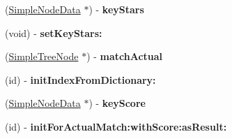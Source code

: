 \begin{DoxyCompactItemize}
\item 
\hypertarget{class_simple_tree_node_aee7720229f05856ff31e09b81da7178c}{
(\hyperlink{interface_simple_node_data}{SimpleNodeData} $\ast$) -\/ {\bfseries keyStars}}
\label{class_simple_tree_node_aee7720229f05856ff31e09b81da7178c}

\item 
\hypertarget{class_simple_tree_node_a2d561f91aee8a54c6367390720a39137}{
(void) -\/ {\bfseries setKeyStars:}}
\label{class_simple_tree_node_a2d561f91aee8a54c6367390720a39137}

\item 
\hypertarget{class_simple_tree_node_af4a860a81247a2b76fd40e5ba7596d79}{
(\hyperlink{class_simple_tree_node}{SimpleTreeNode} $\ast$) -\/ {\bfseries matchActual}}
\label{class_simple_tree_node_af4a860a81247a2b76fd40e5ba7596d79}

\item 
\hypertarget{class_simple_tree_node_adea7c1a592fa474868ec9e092e667e44}{
(id) -\/ {\bfseries initIndexFromDictionary:}}
\label{class_simple_tree_node_adea7c1a592fa474868ec9e092e667e44}

\item 
\hypertarget{class_simple_tree_node_aa02d2705812ad8f54066d1547b2e6938}{
(\hyperlink{interface_simple_node_data}{SimpleNodeData} $\ast$) -\/ {\bfseries keyScore}}
\label{class_simple_tree_node_aa02d2705812ad8f54066d1547b2e6938}

\item 
\hypertarget{class_simple_tree_node_ae236d5585d4cf3d8a0f6bdb4f6e119d1}{
(id) -\/ {\bfseries initForActualMatch:withScore:asResult:}}
\label{class_simple_tree_node_ae236d5585d4cf3d8a0f6bdb4f6e119d1}

\end{DoxyCompactItemize}
